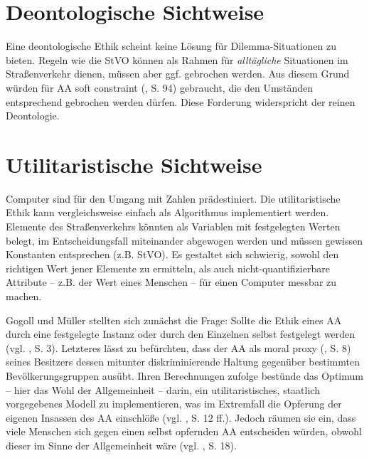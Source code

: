 \documentclass[a4paper, 12pt, titlepage]{scrartcl}
\begin{document}
\section{Deontologische Sichtweise}
	Eine deontologische Ethik scheint keine L\"osung f\"ur Dilemma-Situationen zu bieten. Regeln wie die StVO k\"onnen als Rahmen f\"ur \emph{allt\"agliche} Situationen im Stra\ss enverkehr dienen, m\"ussen aber ggf. gebrochen werden. Aus diesem Grund w\"urden f\"ur AA \glqq soft constraint\grqq{} (\autocite{Gerdes2015}, S. 94) gebraucht, die den Umst\"anden entsprechend gebrochen werden d\"urfen. Diese Forderung widerspricht der reinen Deontologie. 
\section{Utilitaristische Sichtweise}
	Computer sind f\"ur den Umgang mit Zahlen pr\"adestiniert. Die utilitaristische Ethik kann vergleichsweise einfach als Algorithmus implementiert werden. Elemente des Stra\ss enverkehrs k\"onnten als Variablen mit festgelegten Werten belegt, im Entscheidungsfall miteinander abgewogen werden und m\"ussen gewissen Konstanten entsprechen (z.B. StVO). Es gestaltet sich schwierig, sowohl den richtigen Wert jener Elemente zu ermitteln, als auch nicht-quantifizierbare Attribute -- z.B. der \glqq Wert\grqq{} eines Menschen -- f\"ur einen Computer messbar zu machen. 

	
	Gogoll und M\"uller \autocite{Gogoll2016} stellten sich zun\"achst die Frage: Sollte die Ethik eines AA durch eine festgelegte Instanz oder durch den Einzelnen selbst festgelegt werden (vgl. \autocite{Gogoll2016}, S. 3). Letzteres l\"asst zu bef\"urchten, dass der AA als \glqq moral proxy\grqq{} (\autocite{Gogoll2016}, S. 8) seines Besitzers dessen mitunter diskriminierende Haltung gegen\"uber bestimmten Bev\"olkerungsgruppen aus\"ubt. Ihren Berechnungen zufolge best\"unde das Optimum -- hier das Wohl der Allgemeinheit -- darin, ein utilitaristisches, staatlich vorgegebenes Modell zu implementieren, was im Extremfall die Opferung der eigenen Insassen des AA einschl\"o\ss e (vgl. \autocite{Gogoll2016}, S. 12 ff.). Jedoch r\"aumen sie ein, dass viele Menschen sich gegen einen selbst opfernden AA entscheiden w\"urden, obwohl dieser im Sinne der Allgemeinheit w\"are (vgl. \autocite{Gogoll2016}, S. 18). 
	
\end{document}
